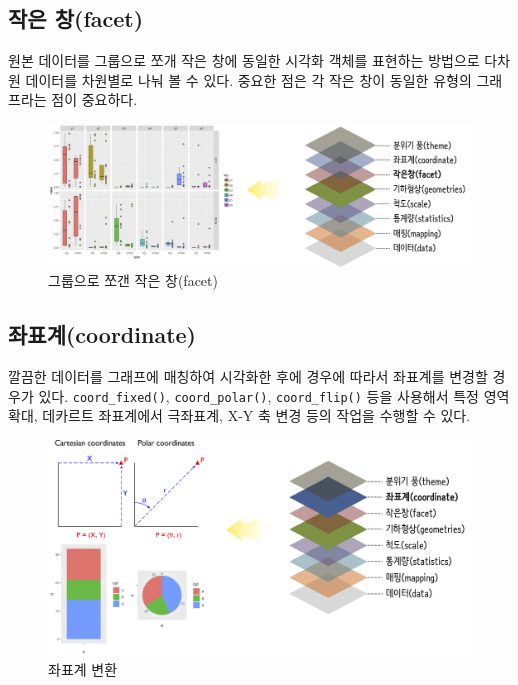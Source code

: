 \documentclass[
]{book}
\begin{document}
\hypertarget{ggplot2-steps-facet}{%
\subsection{작은 창(facet)}\label{ggplot2-steps-facet}}

원본 데이터를 그룹으로 쪼개 작은 창에 동일한 시각화 객체를 표현하는 방법으로 다차원 데이터를 차원별로 나눠 볼 수 있다. 중요한 점은 각 작은 창이 동일한 유형의 그래프라는 점이 중요하다.

\begin{figure}
\centering
\includegraphics[width=1\textwidth,height=\textheight]{assets/images/ggplot-facet.png}
\caption{그룹으로 쪼갠 작은 창(facet)}
\end{figure}

\hypertarget{ggplot2-steps-coordinate}{%
\subsection{좌표계(coordinate)}\label{ggplot2-steps-coordinate}}

깔끔한 데이터를 그래프에 매칭하여 시각화한 후에 경우에 따라서 좌표계를 변경할 경우가 있다. \texttt{coord\_fixed()}, \texttt{coord\_polar()}, \texttt{coord\_flip()} 등을 사용해서 특정 영역 확대, 데카르트 좌표계에서 극좌표계, X-Y 축 변경 등의 작업을 수행할 수 있다.

\begin{figure}
\centering
\includegraphics[width=1\textwidth,height=\textheight]{assets/images/ggplot-coordinate.png}
\caption{좌표계 변환}
\end{figure}
\end{document}
